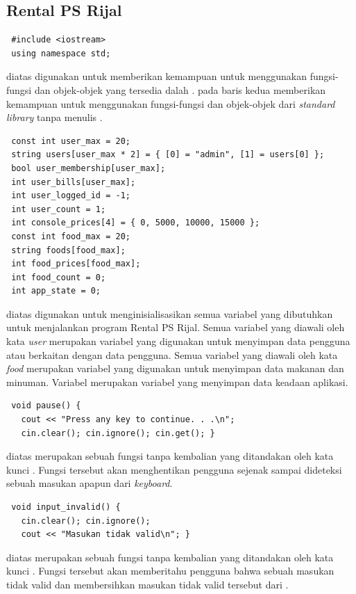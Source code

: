 \documentclass[../main.tex]{subfiles}
\begin{document}
\vspace{-0.5ex}
    \subsection{Rental PS Rijal}
\begin{lstlisting}
 #include <iostream>
 using namespace std;
\end{lstlisting}
    \ilz{}{\Script} diatas digunakan untuk memberikan kemampuan untuk menggunakan fungsi-fungsi dan objek-objek yang tersedia dalah {\header} {\file} . {\Script} pada baris kedua  memberikan kemampuan untuk menggunakan fungsi-fungsi dan objek-objek dari \textit{standard library} tanpa menulis .

\begin{lstlisting}
 const int user_max = 20;
 string users[user_max * 2] = { [0] = "admin", [1] = users[0] };
 bool user_membership[user_max];
 int user_bills[user_max];
 int user_logged_id = -1;
 int user_count = 1;
 int console_prices[4] = { 0, 5000, 10000, 15000 };
 const int food_max = 20;
 string foods[food_max];
 int food_prices[food_max];
 int food_count = 0;
 int app_state = 0;
\end{lstlisting}
    \ilz{}{\Script} diatas digunakan untuk menginisialisasikan semua variabel yang dibutuhkan untuk menjalankan program Rental PS Rijal. Semua variabel yang diawali oleh kata \textit{user} merupakan variabel yang digunakan untuk menyimpan data pengguna atau berkaitan dengan data pengguna. Semua variabel yang diawali oleh kata \textit{food} merupakan variabel yang digunakan untuk menyimpan data makanan dan minuman. Variabel  merupakan variabel yang menyimpan data keadaan aplikasi.

\vspace{-0.15ex}
\begin{lstlisting}
 void pause() {
   cout << "Press any key to continue. . .\n";
   cin.clear(); cin.ignore(); cin.get(); }
\end{lstlisting}
    \ilz{}{\Script} diatas merupakan sebuah fungsi tanpa kembalian yang ditandakan oleh kata kunci . Fungsi tersebut akan menghentikan pengguna sejenak sampai dideteksi sebuah masukan apapun dari \textit{keyboard}.

\vspace{-0.15ex}
\begin{lstlisting}
 void input_invalid() {
   cin.clear(); cin.ignore();
   cout << "Masukan tidak valid\n"; }
\end{lstlisting}
    \ilz{}{\Script} diatas merupakan sebuah fungsi tanpa kembalian yang ditandakan oleh kata kunci . Fungsi tersebut akan memberitahu pengguna bahwa sebuah masukan tidak valid dan membersihkan masukan tidak valid tersebut dari {\ioi} {\stream}.
\end{document}
